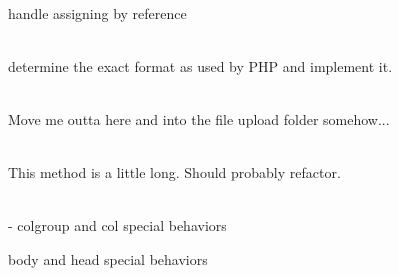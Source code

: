 \begin{DoxyRefList}
\item[Class \doxylink{class_psy_1_1_sudo_1_1_sudo_visitor}{Sudo\+Visitor} ]\hfill \\
\label{todo__todo000034}%
%
handle assigning by reference  
\item[Global \doxylink{class_barryvdh_1_1_reflection_1_1_doc_block_1_1_tag_a278338a00e1596bbb1e906bdcf6b0a18}{Tag\+::export} ()]\hfill \\
\label{todo__todo000004}%
%
determine the exact format as used by PHP  and implement it. 
\item[Global \doxylink{class_livewire_1_1_features_1_1_support_testing_1_1_testable_ac51863f6e559ea54ed9102bc8a4fc4d1}{Testable\+::upload} (\$name, \$files, \$is\+Multiple=false)]\hfill \\
\label{todo__todo000016}%
%
Move me outta here and into the file upload folder somehow...  
\item[Global \doxylink{class_masterminds_1_1_h_t_m_l5_1_1_parser_1_1_tokenizer_a598525592b24959b145b8638c1c0b2ef}{Tokenizer\+::doctype} ()]\hfill \\
\label{todo__todo000019}%
%
This method is a little long. Should probably refactor. 
\item[Class \doxylink{class_masterminds_1_1_h_t_m_l5_1_1_parser_1_1_tree_building_rules}{Tree\+Building\+Rules} ]\hfill \\
\label{todo__todo000020}%
%
-\/ colgroup and col special behaviors
\begin{DoxyItemize}
\item body and head special behaviors 
\end{DoxyItemize}
\end{DoxyRefList}